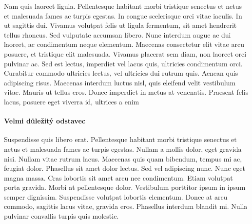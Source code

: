 		Nam quis laoreet ligula. Pellentesque habitant morbi tristique senectus et netus et malesuada fames ac turpis egestas. In congue scelerisque orci vitae iaculis. In ut sagittis dui. Vivamus volutpat felis ut ligula fermentum, sit amet hendrerit tellus rhoncus. Sed vulputate accumsan libero. Nunc interdum augue ac dui laoreet, ac condimentum neque elementum. Maecenas consectetur elit vitae arcu posuere, et tristique elit malesuada. Vivamus placerat sem diam, non laoreet orci pulvinar ac. Sed est lectus, imperdiet vel lacus quis, ultricies condimentum orci. Curabitur commodo ultricies lectus, vel ultricies dui rutrum quis. Aenean quis adipiscing risus. Maecenas interdum luctus nisl, quis eleifend velit vestibulum vitae. Mauris ut tellus eros. Donec imperdiet in metus at venenatis. Praesent felis lacus, posuere eget viverra id, ultrices a enim
	
		\paragraph{Velmi důležitý odstavec}
		Suspendisse quis libero erat. Pellentesque habitant morbi tristique senectus et netus et malesuada fames ac turpis egestas. Nullam a mollis dolor, eget gravida nisi. Nullam vitae rutrum lacus. Maecenas quis quam bibendum, tempus mi ac, feugiat dolor. Phasellus sit amet dolor lectus. Sed vel adipiscing nunc. Nunc eget magna massa. Cras lobortis sit amet arcu nec condimentum. Etiam volutpat porta gravida. Morbi at pellentesque dolor. Vestibulum porttitor ipsum in ipsum semper dignissim. Suspendisse volutpat lobortis elementum. Donec at arcu commodo, sagittis lacus vitae, gravida eros. Phasellus interdum blandit mi. Nulla pulvinar convallis turpis quis molestie.\\

